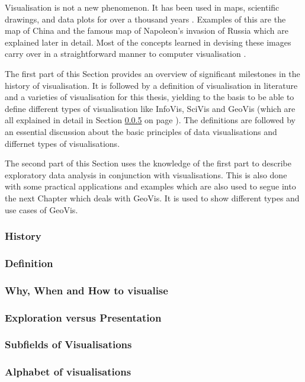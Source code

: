 Visualisation is not a new phenomenon. It has been used in maps, scientific drawings, and data plots for over a thousand years . Examples of this are the map of China and the famous map of Napoleon's invasion of Russia which are explained later in detail. Most of the concepts learned in devising these images carry over in a straightforward manner to computer visualisation .

The first part of this Section provides an overview of significant milestones in the history of visualisation. It is followed by a definition of visualisation in literature and a varieties of visualisation for this thesis, yielding to the basis to be able to define different types of visualisation like \ac{InfoVis}, \ac{SciVis} and \ac{GeoVis} (which are all explained in detail in Section \ref{s:definitions-types} on page \pageref{s:definitions-types}). The definitions are followed by an essential discussion about the basic principles of data visualisations and differnet types of visualisations.

The second part of this Section uses the knowledge of the first part to describe exploratory data analysis in conjunction with visualisations. This is also done with some practical applications and examples which are also used to segue into the next Chapter which deals with \ac{GeoVis}. It is used to show different types and use cases of \ac{GeoVis}.

\subsubsection{History}
\label{s:history}


\subsubsection{Definition}
\label{s:definition}


\subsubsection{Why, When and How to visualise}
\label{s:basics}


\subsubsection{Exploration versus Presentation}
\label{s:eda}


\subsubsection{Subfields of Visualisations}
\label{s:definitions-types}


\subsubsection{Alphabet of visualisations}

